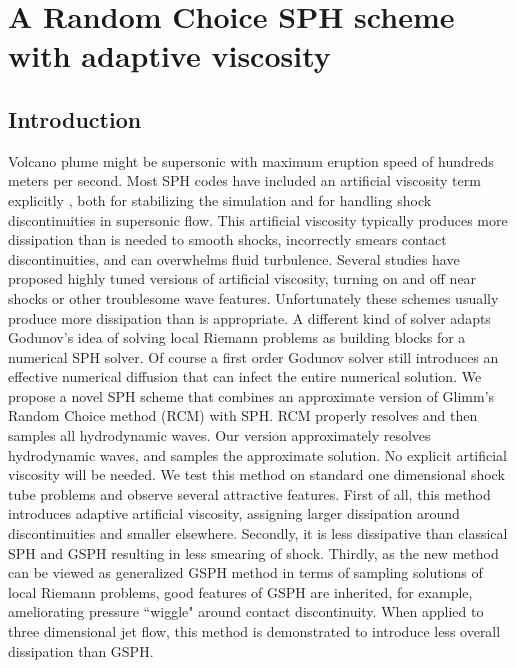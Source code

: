 \chapter{A Random Choice SPH scheme with adaptive viscosity} \label{chapter:GSPH-RSPH}
\section{Introduction}
Volcano plume might be supersonic with maximum eruption speed of hundreds meters per second.
Most SPH codes have included an artificial viscosity term explicitly \citep{monaghan1983shock, monaghan1997sph, klapp2012strong}, both for stabilizing the simulation and for handling shock discontinuities in supersonic flow. This artificial viscosity typically produces more dissipation than is needed to smooth shocks, incorrectly smears contact discontinuities, and can overwhelms fluid turbulence. Several studies have proposed highly tuned versions of artificial viscosity, turning on and off near shocks or other troublesome wave features. Unfortunately these schemes usually produce more dissipation than is appropriate.
A different kind of solver adapts Godunov\rq{}s idea of solving local Riemann problems as building blocks for a numerical SPH solver. Of course a first order Godunov solver still introduces an effective numerical diffusion that can infect the entire numerical solution.
We propose a novel SPH scheme that combines an approximate version of Glimm\rq{}s Random Choice method (RCM) with SPH. RCM properly resolves and then samples all hydrodynamic waves. Our version approximately resolves hydrodynamic waves, and samples the approximate solution. No explicit artificial viscosity will be needed.
We test this method on standard one dimensional shock tube problems and observe several attractive features. First of all, this method introduces adaptive artificial viscosity, assigning larger dissipation around discontinuities and smaller elsewhere. Secondly, it is less dissipative than classical SPH and GSPH resulting in less smearing of shock. Thirdly, as the new method can be viewed as generalized GSPH method in terms of sampling solutions of local Riemann problems, good features of GSPH are inherited, for example, ameliorating pressure ``wiggle" around contact discontinuity.
When applied to three dimensional jet flow, this method is demonstrated to introduce less overall dissipation than GSPH.

